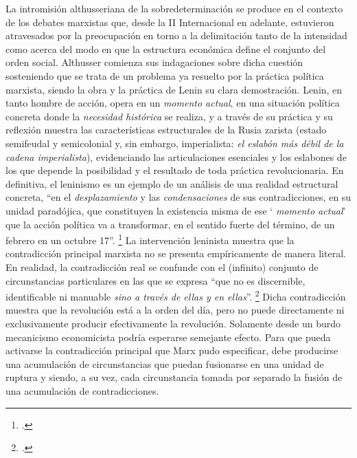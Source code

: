 La intromisión althusseriana de la sobredeterminación se produce en el contexto de los debates marxistas que, desde la II Internacional en adelante, estuvieron atravesados por la preocupación en torno a la delimitación tanto de la intensidad como acerca del modo en que la estructura económica define el conjunto del orden social. Althusser comienza sus indagaciones sobre dicha cuestión sosteniendo que se trata de un problema ya resuelto por la práctica política marxista, siendo la obra y la práctica de Lenin su clara demostración. Lenin, en tanto hombre de acción, opera en un \emph{momento actual}, en una situación política concreta donde la \emph{necesidad histórica} se realiza, y a través de su práctica y su reflexión muestra las características estructurales de la Rusia zarista (estado semifeudal y semicolonial y, sin embargo, imperialista: \emph{el eslabón más débil de la cadena imperialista}), evidenciando las articulaciones esenciales y los eslabones de los que depende la posibilidad y el resultado de toda práctica revolucionaria. En definitiva, el leninismo es un ejemplo de un análisis de una realidad estructural concreta, \enquote{en el \emph{desplazamiento} y las \emph{condensaciones} de sus contradicciones, en su unidad paradójica, que constituyen la existencia misma de ese \enquote{ \emph{momento actual}} que la acción política va a transformar, en el sentido fuerte del término, de un febrero en un octubre 17}. \footcite[][147]{@7051-ALTHUSSER1965} La intervención leninista muestra que la contradicción principal marxista no se presenta empíricamente de manera literal. En realidad, la contradicción real se confunde con el (infinito) conjunto de circunstancias particulares en las que se expresa \enquote{que no es discernible, identificable ni manuable \emph{sino a través de ellas y en ellas}}. \footcite[][79]{@7051-ALTHUSSER1965} Dicha contradicción muestra que la revolución está a la orden del día, pero no puede directamente ni exclusivamente producir efectivamente la revolución. Solamente desde un burdo mecanicismo economicista podría esperarse semejante efecto. Para que pueda activarse la contradicción principal que Marx pudo especificar, debe producirse una acumulación de circunstancias  que puedan fusionarse en una unidad de ruptura y siendo, a su vez, cada circunstancia tomada por separado la fusión de una acumulación de contradicciones.

